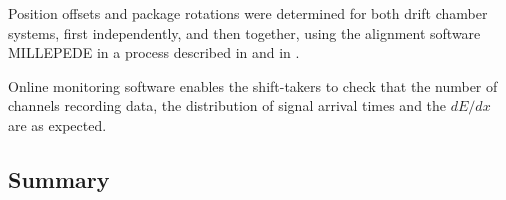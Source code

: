 Position offsets and package rotations were determined for both drift chamber systems, first independently, and then together, using the alignment software MILLEPEDE\cite{millepede} in a process described in \cite{GlueXCDCNIM} and in \cite{MikeStaib_thesis}.

Online monitoring software enables the shift-takers to check that the number of channels recording data, the distribution of signal arrival times and the $dE/dx$ are as expected. 


\subsection{Summary \label{sec:dcsummary}}
 
 
